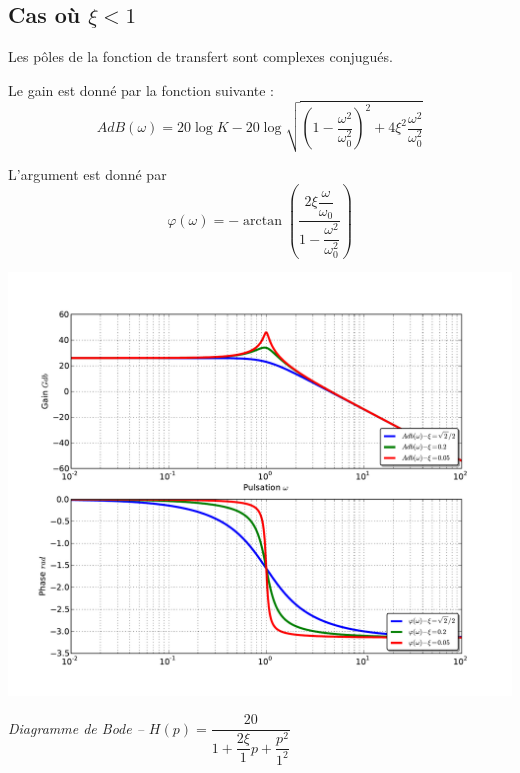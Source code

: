 \documentclass[10pt,oneside]{article}
\begin{document}


%
%
%
%
%

\subsection{Cas où $\xi<1$}
Les pôles de la fonction de transfert sont complexes conjugués.

Le gain est donné par la fonction suivante : 
$$
AdB(\omega)=20\log K - 20 \log \sqrt{\left(1-\dfrac{\omega^2}{\omega_0^2}\right)^2+4\xi^2\dfrac{\omega^2}{\omega_0^2}}
$$

L'argument est donné par 
$$
\varphi(\omega)=-\arctan \left(\dfrac{2\xi\dfrac{\omega}{\omega_0}}{1-\dfrac{\omega^2}{\omega_0^2}} \right)
$$


\begin{center}
\includegraphics[width=.9\textwidth]{png/ordre2_bode.pdf}

\textit{Diagramme de Bode -- $H(p)=\dfrac{20}{1+ \dfrac{2\xi}{1}p+\dfrac{p^2}{1^2}}$}
\end{center}
\end{document}
